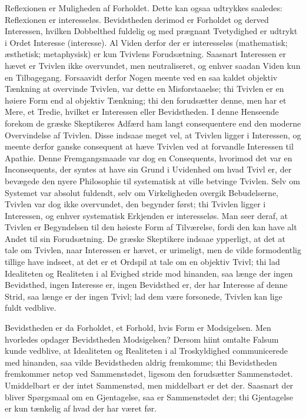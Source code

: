 \documentclass[12pt,a4paper]{article}
\begin{document}
Reflexionen er Muligheden af Forholdet. Dette kan ogsaa udtrykkes saaledes: Reflexionen er interesseløs. Bevidstheden derimod er Forholdet og derved Interessen, hvilken Dobbelthed fuldelig og med prægnant Tvetydighed er udtrykt i Ordet Interesse (interesse). Al Viden derfor der er interesseløs (mathematisk; æsthetisk; metaphysisk) er kun Tvivlens Forudsætning. Saasnart Interessen er hævet er Tvivlen ikke overvundet, men neutraliseret, og enhver saadan Viden kun en Tilbagegang. Forsaavidt derfor Nogen meente ved en saa kaldet objektiv Tænkning at overvinde Tvivlen, var dette en Misforstaaelse; thi Tvivlen er en høiere Form end al objektiv Tænkning; thi den forudsætter denne, men har et Mere, et Tredie, hvilket er Interessen eller Bevidstheden. I denne Henseende forekom de græske Skeptikeres Adfærd ham langt consequentere end den moderne Overvindelse af Tvivlen. Disse indsaae meget vel, at Tvivlen ligger i Interessen, og meente derfor ganske consequent at hæve Tvivlen ved at forvandle Interessen til Apathie. Denne Fremgangsmaade var dog en Consequents, hvorimod det var en Inconsequents, der syntes at have sin Grund i Uvidenhed om hvad Tvivl er, der bevægede den nyere Philosophie til systematisk at ville betvinge Tvivlen. Selv om Systemet var absolut fuldendt, selv om Virkeligheden overgik Bebudelserne, Tvivlen var dog ikke overvundet, den begynder først; thi Tvivlen ligger i Interessen, og enhver systematisk Erkjenden er interesseløs. Man seer deraf, at Tvivlen er Begyndelsen til den høieste Form af Tilværelse, fordi den kan have alt Andet til sin Forudsætning. De græske Skeptikere indsaae ypperligt, at det at tale om Tvivlen, naar Interessen er hævet, er urimeligt, men de vilde formodentlig tillige have indseet, at det er et Ordspil at tale om en objektiv Tvivl; thi lad Idealiteten og Realiteten i al Evighed stride mod hinanden, saa længe der ingen Bevidsthed, ingen Interesse er, ingen Bevidsthed er, der har Interesse af denne Strid, saa længe er der ingen Tvivl; lad dem være forsonede, Tvivlen kan lige fuldt vedblive.

Bevidstheden er da Forholdet, et Forhold, hvis Form er Modsigelsen. Men hvorledes opdager Bevidstheden Modsigelsen? Dersom hiint omtalte Falsum kunde vedblive, at Idealiteten og Realiteten i al Troskyldighed communicerede med hinanden, saa vilde Bevidstheden aldrig fremkomme; thi Bevidstheden fremkommer netop ved Sammenstødet, ligesom den forudsætter Sammenstødet. Umiddelbart er der intet Sammenstød, men middelbart er det der. Saasnart der bliver Spørgsmaal om en Gjentagelse, saa er Sammenstødet der; thi Gjentagelse er kun tænkelig af hvad der har været før.
\end{document}
